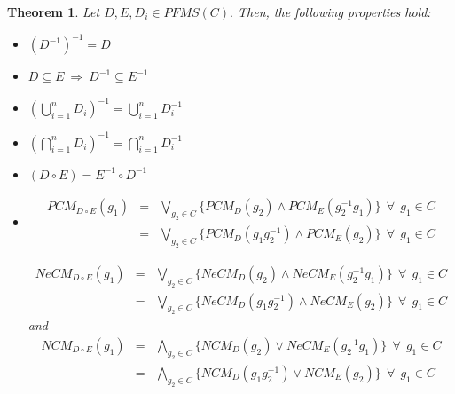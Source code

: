 \documentclass[12pt,letterpaper]{amsart}
\newcommand{\dis}{\displaystyle}
\theoremstyle{plain}
\newtheorem{theorem}{Theorem}[section]
\theoremstyle{definition}
\numberwithin{equation}{section}
\begin{document}
\begin{theorem}
Let $D, E, D_i \in PFMS(C).$ Then, the following properties hold:
\begin{itemize}
\item [i.] $(D^{-1})^{-1} = D$
\item [ii.] $D \subseteq E~\Rightarrow~D^{-1} \subseteq E^{-1}$
\item [iii.] $ \dis \left(\bigcup^n_{i = 1} D_i\right)^{-1} = \bigcup^n_{i = 1} D_i^{-1}$
\item [iv.] $\dis \left(\bigcap^n_{i = 1} D_i\right)^{-1} = \bigcap^n_{i = 1} D_i^{-1}$
\item [v.] $(D \circ E) = E^{-1} \circ D^{-1}$
\item [vi.] 
\begin{eqnarray*}
PCM_{D \circ E}(g_1) & = & \bigvee_{g_2 \in C} \lbrace PCM_D(g_2) \wedge PCM_E(g_2^{-1}g_1)\rbrace~~ \forall~~ g_1 \in C\\
& = & \bigvee_{g_2 \in C} \lbrace PCM_D(g_1 g^{-1}_2) \wedge PCM_E(g_2)\rbrace~~ \forall~~ g_1 \in C
\end{eqnarray*}

\begin{eqnarray*}
NeCM_{D \circ E}(g_1) & = & \bigvee_{g_2 \in C} \lbrace NeCM_D(g_2) \wedge NeCM_E(g_2^{-1}g_1)\rbrace~~ \forall~~ g_1 \in C\\
& = & \bigvee_{g_2 \in C} \lbrace NeCM_D(g_1 g^{-1}_2) \wedge NeCM_E(g_2)\rbrace~~ \forall~~ g_1 \in C
\end{eqnarray*}
and 
\begin{eqnarray*}
NCM_{D \circ E}(g_1) & = & \bigwedge_{g_2 \in C} \lbrace NCM_D(g_2) \vee NeCM_E(g_2^{-1}g_1)\rbrace~~ \forall~~ g_1 \in C\\
& = & \bigwedge_{g_2 \in C} \lbrace NCM_D(g_1 g^{-1}_2) \vee NCM_E(g_2)\rbrace~~ \forall~~ g_1 \in C
\end{eqnarray*}
\end{itemize} 
\end{theorem}
\end{document}
